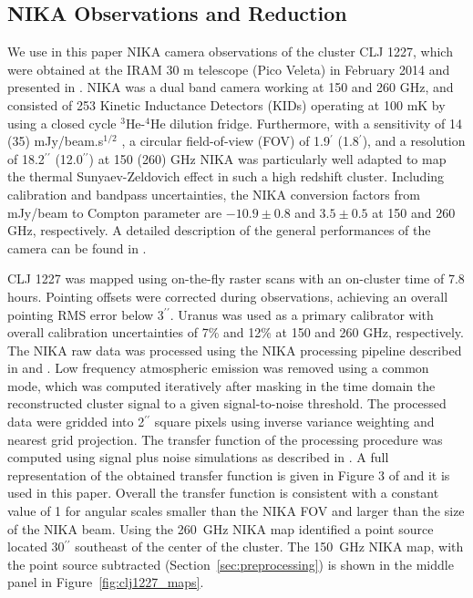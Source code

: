 \documentclass[twocolumn,traditabstract]{aa}
\begin{document}
\subsection{NIKA Observations and Reduction}
\label{sec:nikaobs}
We use in this paper NIKA camera observations of the cluster CLJ 1227, which were obtained at the IRAM 30 m telescope (Pico Veleta)
in February 2014 and presented in \citet{adam2015}. NIKA \citep{monfardini2010,monfardini2014} was a dual band camera working at 150 and
260 GHz, and consisted of 253 Kinetic Inductance Detectors (KIDs) operating at 100 mK by using a closed cycle $^3$He-$^4$He dilution fridge. 
Furthermore, with a sensitivity of 14 (35) mJy/beam.s$^{1/2}$ , a circular field-of-view (FOV) of 1.9$^{\prime}$ (1.8$^{\prime}$), and a
resolution of 18.2$^{\prime \prime}$ (12.0$^{\prime \prime}$) at 150 (260) GHz NIKA was particularly well adapted to map the thermal
Sunyaev-Zeldovich effect in such a high redshift cluster. Including calibration and bandpass uncertainties, the NIKA conversion
factors from mJy/beam to Compton parameter are $-10.9 \pm 0.8$ and $3.5\pm0.5$ at 150 and 260 GHz, respectively.
A detailed description of the general performances of the camera can be found in \citet{catalano2014,adam2014}.

CLJ 1227 was mapped using on-the-fly raster scans
with an on-cluster time of 7.8 hours. Pointing offsets were corrected during observations, achieving an overall pointing RMS
error below 3$^{\prime \prime}$. Uranus was used as a primary calibrator with overall calibration uncertainties of 7\% and 12\% at
150 and 260 GHz, respectively. The NIKA raw data was processed using the NIKA processing pipeline described in \citet{adam2014} and
\citet{adam2015}. Low frequency atmospheric emission was removed using a common mode, which was computed iteratively after masking
in the time domain the reconstructed cluster signal to a given signal-to-noise threshold. 
The processed data were gridded into 2$^{\prime \prime}$ square pixels using inverse variance weighting and nearest grid projection.
The transfer function of the processing procedure was computed using signal plus noise simulations as described in \citet{adam2015}.
A full representation of the obtained transfer function is given in Figure 3 of \citet{adam2015} and it is used in this paper.
Overall the transfer function is consistent with a constant value of 1 for angular scales smaller than the NIKA FOV and larger
than the size of the NIKA beam. Using the 260~GHz NIKA map \citet{adam2015} identified a point source located 30$^{\prime \prime}$
southeast of the center of the cluster. The 150~GHz NIKA map, with the point source subtracted (Section~\ref{sec:preprocessing})
is shown in the middle panel in Figure~\ref{fig:clj1227_maps}.
\end{document}
